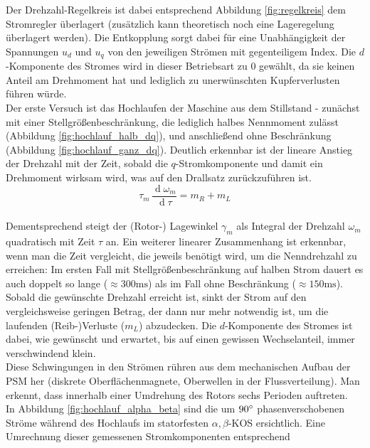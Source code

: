 \noindent Der Drehzahl-Regelkreis ist dabei entsprechend Abbildung \ref{fig:regelkreis} dem Stromregler überlagert (zusätzlich kann theoretisch noch eine Lageregelung überlagert werden). Die Entkopplung sorgt dabei für eine Unabhängigkeit der Spannungen $u_d$ und $u_q$ von den jeweiligen Strömen mit gegenteiligem Index. Die $d$-Komponente des Stromes wird in dieser Betriebsart zu 0 gewählt, da sie keinen Anteil am Drehmoment hat und lediglich zu unerwünschten Kupferverlusten führen würde.\\
\noindent Der erste Versuch ist das Hochlaufen der Maschine aus dem Stillstand - zunächst mit einer Stellgrößenbeschränkung, die lediglich halbes Nennmoment zulässt (Abbildung \ref{fig:hochlauf_halb_dq}), und anschließend ohne Beschränkung (Abbildung \ref{fig:hochlauf_ganz_dq}). Deutlich erkennbar ist der lineare Anstieg der Drehzahl mit der Zeit, sobald die $q$-Stromkomponente und damit ein Drehmoment wirksam wird, was auf den Drallsatz zurückzuführen ist.
\begin{equation*}
    \tau_m\,\frac{\operatorname{d}\omega_m}{\operatorname{d}\tau}=m_R+m_L
\end{equation*}\\
Dementsprechend steigt der (Rotor-) Lagewinkel $\gamma_m$ als Integral der Drehzahl $\omega_m$ quadratisch mit Zeit $\tau$ an. Ein weiterer linearer Zusammenhang ist erkennbar, wenn man die Zeit vergleicht, die jeweils benötigt wird, um die Nenndrehzahl zu erreichen: Im ersten Fall mit Stellgrößenbeschränkung auf halben Strom dauert es auch doppelt so lange ($\approx 300 \si{\milli\second}$) als im Fall ohne Beschränkung ($\approx 150 \si{\milli\second}$).\\
Sobald die gewünschte Drehzahl erreicht ist, sinkt der Strom auf den vergleichsweise geringen Betrag, der dann nur mehr notwendig ist, um die laufenden (Reib-)\-Verluste ($m_L$) abzudecken. Die $d$-Komponente des Stromes ist dabei, wie gewünscht und erwartet, bis auf einen gewissen Wechselanteil, immer verschwindend klein.\\
Diese Schwingungen in den Strömen rühren aus dem mechanischen Aufbau der PSM her (diskrete Oberflächenmagnete, Oberwellen in der Flussverteilung). Man erkennt, dass innerhalb einer Umdrehung des Rotors sechs Perioden auftreten.\\
\noindent In Abbildung \ref{fig:hochlauf_alpha_beta} sind die um $90\degree$ phasenverschobenen Ströme während des Hochlaufs im statorfesten $\alpha,\beta$-KOS ersichtlich. Eine Umrechnung dieser gemessenen Stromkomponenten entsprechend

